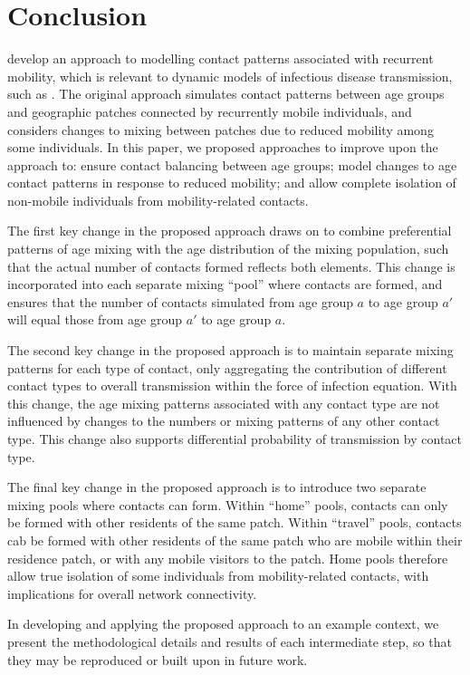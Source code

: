 \section{Conclusion}\label{conc}
\citet{Arenas2020} develop an approach to modelling
contact patterns associated with recurrent mobility,
which is relevant to dynamic models of infectious disease transmission, such as \covid.
The original approach simulates contact patterns between
age groups and geographic patches connected by recurrently mobile individuals,
and considers changes to mixing between patches due to reduced mobility among some individuals.
In this paper, we proposed approaches to improve upon the approach to:
ensure contact balancing between age groups;
model changes to age contact patterns in response to reduced mobility; and
allow complete isolation of non-mobile individuals from mobility-related contacts.
\par
The first key change in the proposed approach draws on \cite{Arregui2018} to
combine preferential patterns of age mixing with the age distribution of the mixing population,
such that the actual number of contacts formed reflects both elements.
This change is incorporated into each separate mixing ``pool'' where contacts are formed,
and ensures that the number of contacts simulated from age group $a$ to age group $a'$
will equal those from age group $a'$ to age group $a$.
\par
The second key change in the proposed approach is to
maintain separate mixing patterns for each type of contact,
only aggregating the contribution of different contact types to overall transmission
within the force of infection equation.
With this change, the age mixing patterns associated with any contact type
are not influenced by changes to the numbers or mixing patterns of any other contact type.
This change also supports differential probability of transmission by contact type.
\par
The final key change in the proposed approach is to
introduce two separate mixing pools where contacts can form.
Within ``home'' pools, contacts can only be formed with other residents of the same patch.
Within ``travel'' pools, contacts cab be formed with other residents of the same patch
who are mobile within their residence patch, or with any mobile visitors to the patch.
Home pools therefore allow true isolation of some individuals from mobility-related contacts,
with implications for overall network connectivity.
\par
In developing and applying the proposed approach to an example context,
we present the methodological details and results of each intermediate step,
so that they may be reproduced or built upon in future work.
